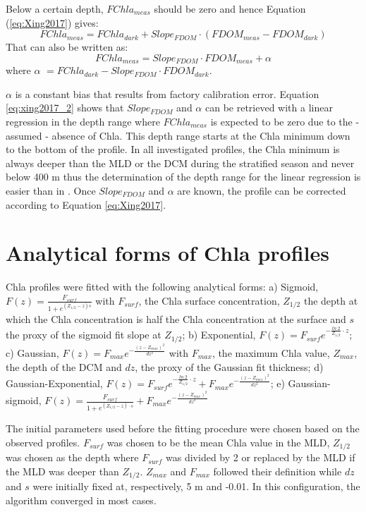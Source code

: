 \documentclass[journal abbreviation, manuscript]{copernicus}
\begin{document}
Below a certain depth, $FChla_{meas}$ should be zero and hence Equation (\ref{eq:Xing2017}) gives:
\begin{equation}\label{eq:xing2017_1}
    FChla_{meas} = FChla_{dark} + Slope_{FDOM} \cdot (FDOM_{meas} - FDOM_{dark})
\end{equation}
That can also be written as:
\begin{equation}\label{eq:xing2017_2}
    FChla_{meas} = Slope_{FDOM} \cdot FDOM_{meas} + \alpha
\end{equation}where $\alpha$ $= FChla_{dark} - Slope_{FDOM} \cdot FDOM_{dark}$.

$\alpha$ is a constant bias that results from factory calibration error. Equation \ref{eq:xing2017_2} shows that $Slope_{FDOM}$ and $\alpha$ can be retrieved with a linear regression in the depth range where $FChla_{meas}$ is expected to be zero due to the - assumed - absence of Chla. This depth range starts at the Chla minimum down to the bottom of the profile. In all investigated profiles, the Chla minimum is always deeper than the MLD or the DCM during the stratified season and never below 400 \unit{m} thus the determination of the depth range for the linear regression is easier than in \citet{Xing2017}. Once $Slope_{FDOM}$ and $\alpha$ are known, the profile can be corrected according to Equation \ref{eq:Xing2017}.

\section{Analytical forms of Chla profiles}     %
\label{sec:forms}
Chla profiles were fitted with the following analytical forms: a) Sigmoid, $F(z) = \frac{F_{surf}}{1+e^{(Z_{1/2}-z)s}}$ with $F_{surf}$, the Chla surface concentration, $Z_{1/2}$ the depth at which the Chla concentration is half the Chla concentration at the surface and $s$ the proxy of the sigmoid fit slope at $Z_{1/2}$; b) Exponential, $F(z) = F_{surf}e^{-\frac{ln~2}{Z_{1/2}}\cdot z}$; c) Gaussian, $F(z) = F_{max}e^{-\frac{(z-Z_{max})^2}{dz^{2}}}$ with $F_{max}$, the maximum Chla value, $Z_{max}$, the depth of the DCM and $dz$, the proxy of the Gaussian fit thickness; d) Gaussian-Exponential, $F(z) = F_{surf}e^{-\frac{ln~2}{Z_{1/2}}\cdot z} + F_{max}e^{-\frac{(z-Z_{max})^2}{dz^{2}}}$; e) Gaussian-sigmoid, 
$F(z) = \frac{F_{surf}}{1+e^{(Z_{1/2}-z)\cdot s}} + F_{max}e^{-\frac{(z-Z_{max})^2}{dz^{2}}}$

The initial parameters used before the fitting procedure were chosen based on the observed profiles. $F_{surf}$ was chosen to be the mean Chla value in the MLD, $Z_{1/2}$ was chosen as the depth where $F_{surf}$ was divided by 2 or replaced by the MLD if the MLD was deeper than $Z_{1/2}$. $Z_{max}$ and $F_{max}$ followed their definition while $dz$ and $s$ were initially fixed at, respectively, 5 \unit{m} and -0.01. In this configuration, the algorithm converged in most cases.
\end{document}
